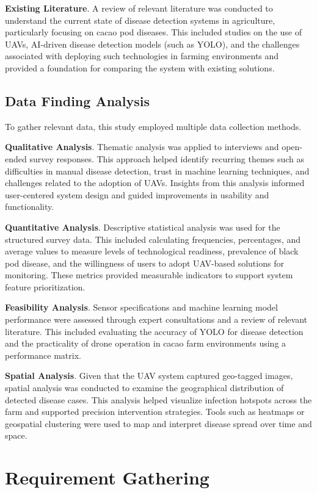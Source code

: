 \textbf{Existing Literature}. A review of relevant literature was conducted to understand the current state of disease detection systems in agriculture, particularly focusing on cacao pod diseases. This included studies on the use of UAVs, AI-driven disease detection models (such as YOLO), and the challenges associated with deploying such technologies in farming environments and provided a foundation for comparing the system with existing solutions.

\subsection*{Data Finding Analysis}

To gather relevant data, this study employed multiple data collection methods.

\textbf{Qualitative Analysis}. Thematic analysis was applied to interviews and open-ended survey responses. This approach helped identify recurring themes such as difficulties in manual disease detection, trust in machine learning techniques, and challenges related to the adoption of UAVs. Insights from this analysis informed user-centered system design and guided improvements in usability and functionality.

\textbf{Quantitative Analysis}. Descriptive statistical analysis was used for the structured survey data. This included calculating frequencies, percentages, and average values to measure levels of technological readiness, prevalence of black pod disease, and the willingness of users to adopt UAV-based solutions for monitoring. These metrics provided measurable indicators to support system feature prioritization.


\textbf{Feasibility Analysis}. Sensor specifications and machine learning model performance were assessed through expert consultations and a review of relevant literature. This included evaluating the accuracy of YOLO for disease detection and the practicality of drone operation in cacao farm environments using a performance matrix.

\textbf{Spatial Analysis}. Given that the UAV system captured geo-tagged images, spatial analysis was conducted to examine the geographical distribution of detected disease cases. This analysis helped visualize infection hotspots across the farm and supported precision intervention strategies. Tools such as heatmaps or geospatial clustering were used to map and interpret disease spread over time and space.

\section{Requirement Gathering}

